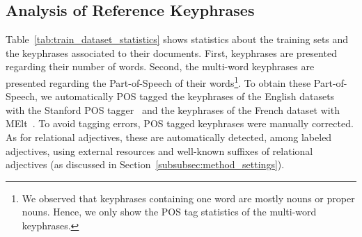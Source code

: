   \subsection{Analysis of Reference Keyphrases}
  \label{subsec:keyphrase_analysis}
    Table~\ref{tab:train_dataset_statistics} shows statistics about the training
    sets and the keyphrases associated to their documents. First, keyphrases are
    presented regarding their number of words. Second, the multi-word keyphrases
    are presented regarding the Part-of-Speech of their words\footnote{We
    observed that keyphrases containing one word are mostly nouns or proper
    nouns. Hence, we only show the POS tag statistics of the multi-word
    keyphrases.}. To obtain these Part-of-Speech, we automatically POS tagged
    the keyphrases of the English datasets with the Stanford POS
    tagger~\cite{toutanova2003stanfordpostagger} and the keyphrases of the
    French dataset with MElt~\cite{denis2009melt}. To avoid tagging errors, POS
    tagged keyphrases were manually corrected. As for relational adjectives,
    these are automatically detected, among labeled adjectives, using external
    resources and well-known suffixes of relational adjectives (as discussed in
    Section~\ref{subsubsec:method_settings}).
    
